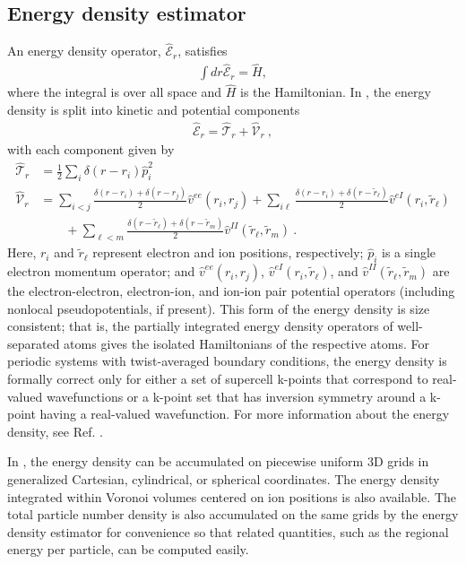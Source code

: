 \subsection{Energy density estimator}
An energy density operator, $\hat{\mathcal{E}}_r$,  satisfies
\begin{align}
  \int dr \hat{\mathcal{E}}_r = \hat{H},
\end{align}
where the integral is over all space and $\hat{H}$ is the Hamiltonian.  In \qmcpack, the energy density is split into kinetic and potential components
\begin{align}
  \hat{\mathcal{E}}_r = \hat{\mathcal{T}}_r + \hat{\mathcal{V}}_r\:, 
\end{align}
with each component given by
\begin{align}
   \hat{\mathcal{T}}_r &=  \frac{1}{2}\sum_i\delta(r-r_i)\hat{p}_i^2 \\  
   \hat{\mathcal{V}}_r &=  \sum_{i<j}\frac{\delta(r-r_i)+\delta(r-r_j)}{2}\hat{v}^{ee}(r_i,r_j)
              + \sum_{i\ell}\frac{\delta(r-r_i)+\delta(r-\tilde{r}_\ell)}{2}\hat{v}^{eI}(r_i,\tilde{r}_\ell) \nonumber\\ 
    &\qquad   + \sum_{\ell< m}\frac{\delta(r-\tilde{r}_\ell)+\delta(r-\tilde{r}_m)}{2}\hat{v}^{II}(\tilde{r}_\ell,\tilde{r}_m)\:.\nonumber
\end{align}
Here, $r_i$ and $\tilde{r}_\ell$ represent electron and ion positions, respectively; $\hat{p}_i$ is a single electron momentum operator; and $\hat{v}^{ee}(r_i,r_j)$, $\hat{v}^{eI}(r_i,\tilde{r}_\ell)$, and $\hat{v}^{II}(\tilde{r}_\ell,\tilde{r}_m)$ are the electron-electron, electron-ion, and ion-ion pair potential operators (including nonlocal pseudopotentials, if present).  This form of the energy density is size consistent; that is, the partially integrated energy density operators of well-separated atoms gives the isolated Hamiltonians of the respective atoms.  For periodic systems with twist-averaged boundary conditions, the energy density is formally correct only for either a set of supercell k-points that correspond to real-valued wavefunctions or a k-point set that has inversion symmetry around a k-point having a real-valued wavefunction.  For more information about the energy density, see Ref. \cite{Krogel2013}.

In \qmcpack, the energy density can be accumulated on piecewise uniform 3D grids in generalized Cartesian, cylindrical, or spherical coordinates.  The energy density integrated within Voronoi volumes centered on ion positions is also available.  The total particle number density is also accumulated on the same grids by the energy density estimator for convenience so that related quantities, such as the regional energy per particle, can be computed easily.


